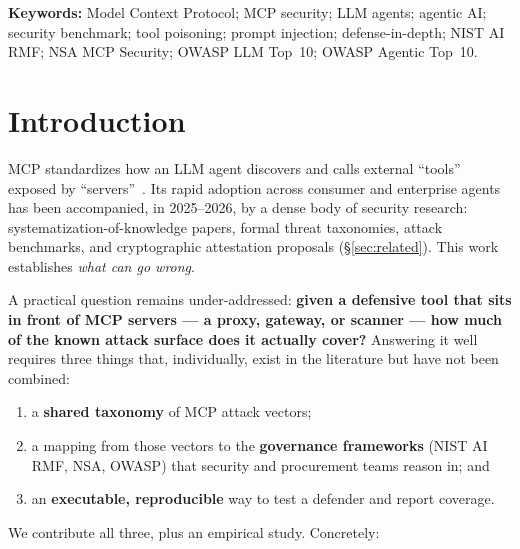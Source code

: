\documentclass[11pt]{article}
\begin{document}
\noindent\textbf{Keywords:} Model Context Protocol; MCP security; LLM agents; agentic AI; security benchmark; tool poisoning; prompt injection; defense-in-depth; NIST AI RMF; NSA MCP Security; OWASP LLM Top~10; OWASP Agentic Top~10.

\section{Introduction}
\label{sec:intro}

MCP standardizes how an LLM agent discovers and calls external ``tools'' exposed by ``servers''~\citep{mcpspec}. Its rapid adoption across consumer and enterprise agents has been accompanied, in 2025--2026, by a dense body of security research: systematization-of-knowledge papers, formal threat taxonomies, attack benchmarks, and cryptographic attestation proposals (\S\ref{sec:related}). This work establishes \emph{what can go wrong}.

A practical question remains under-addressed: \textbf{given a defensive tool that sits in front of MCP servers --- a proxy, gateway, or scanner --- how much of the known attack surface does it actually cover?} Answering it well requires three things that, individually, exist in the literature but have not been combined:

\begin{enumerate}[leftmargin=1.4em,itemsep=1pt,topsep=2pt]
  \item a \textbf{shared taxonomy} of MCP attack vectors;
  \item a mapping from those vectors to the \textbf{governance frameworks} (NIST AI RMF, NSA, OWASP) that security and procurement teams reason in; and
  \item an \textbf{executable, reproducible} way to test a defender and report coverage.
\end{enumerate}

We contribute all three, plus an empirical study. Concretely:
\end{document}
